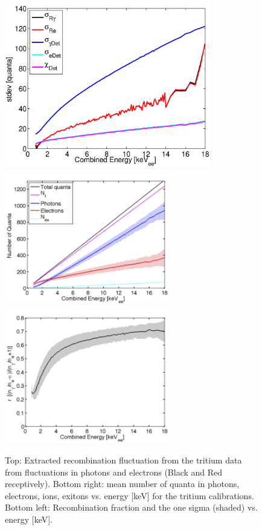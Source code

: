  \begin{figure}[h!]\centering
 \includegraphics[width=90mm]{Recombination_LY_QY/Figures/Iter0/std_fig_.eps}
 \includegraphics[width=72mm]{Recombination_LY_QY/Figures/Iter0/quanta_LY_QY_0.png}
 \includegraphics[width=72mm]{Recombination_LY_QY/Figures/Iter0/R_LY_QY_0.png}
\caption{Top: Extracted recombination fluctuation from the tritium data from fluctuations in photons and electrons (Black and Red receptively). Bottom right: mean number of quanta in photons, electrons, ions, exitons vs. energy [keV] for the tritium calibrations. Bottom left: Recombination fraction and the one sigma (shaded) vs. energy [keV].}
\label{fig:Rec_0}
\end{figure}

